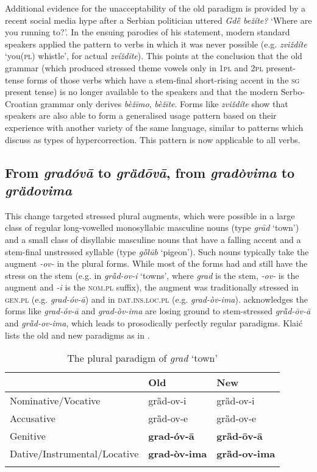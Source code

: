 \documentclass[output=paper,modfonts,nonflat
]{langsci/langscibook}
\begin{document}
Additional evidence for the unacceptability of the old paradigm is provided by a recent social media hype after a Serbian politician uttered \textit{Gdȅ bežíte?} `Where are you running to?'. In the ensuing parodies of his statement, modern standard speakers applied the pattern to verbs in which it was never possible (e.g. \textit{zviždíte} `you(\textsc{pl}) whistle', for actual \textit{zvíždīte}). This points at the conclusion that the old grammar (which produced stressed theme vowels only in 1\textsc{pl} and 2\textsc{pl} present-tense forms of those verbs which have a stem-final short-rising accent in the \textsc{sg}  present tense) is no longer available to the speakers and that the modern Serbo-Croatian grammar only derives \textit{bèžīmo}, \textit{bèžīte}. Forms like \textit{zviždíte} show that  speakers are also able to form a generalised usage pattern based on their experience with another variety of the same language, similar to patterns which \citet{Janda1994} discuss as types of hypercorrection. This pattern is now applicable to all verbs. 
\subsection{From \textit{gradóvā} to \textit{grȁdōvā}, from \textit{gradòvima} to \textit{grȁdovima}} \label{sec:kager:subsec23}

This change targeted stressed plural augments, which were possible in a large class of regular long-vowelled monosyllabic masculine nouns (type \textit{grȃd} `town’) and a small class of disyllabic masculine nouns that have a falling accent and a stem-final unstressed syllable (type \textit{gȍlūb} `pigeon’). Such nouns typically take the augment \textit{-ov-} in the plural forms. While most of the forms had and still have the stress on the stem (e.g. in \textit{grȁd-ov-i} `towns', where \textit{grad} is the stem, \textit{-ov-} is the augment and \textit{-i} is the \textsc{nom}.\textsc{pl} suffix), the augment was traditionally stressed in \textsc{gen}.\textsc{pl} (e.g. \textit{grad-óv-ā}) and in \textsc{dat}.\textsc{ins}.\textsc{loc}.\textsc{pl} (e.g. \textit{grad-òv-ima}). \citet[19--20]{Klaic2013} acknowledges the forms like \textit{grad-óv-ā} and \textit{grad-òv-ima} are losing ground to stem-stressed \textit{grȁd-ōv-ā} and \textit{grȁd-ov-ima}, which leads to prosodically perfectly regular paradigms.  Klaić lists the old and new paradigms as in  .

\begin{table}
\caption{The plural paradigm of \textit{grad} `town'}
\label{tab:kager:4}
 \begin{tabular}{  l  l  l }
 \lsptoprule
& Old & New\\ 
 \midrule
  Nominative/Vocative  &  grȁd-ov-i  &   grȁd-ov-i\\
  Accusative  &  grȁd-ov-e &grȁd-ov-e\\
Genitive  &  \textbf{grad-óv-ā}& \textbf{grȁd-ōv-ā}\\
Dative/Instrumental/Locative  & \textbf{grad-òv-ima}& \textbf{grȁd-ov-ima}\\
  \lspbottomrule
 \end{tabular}
\end{table}
\end{document}
